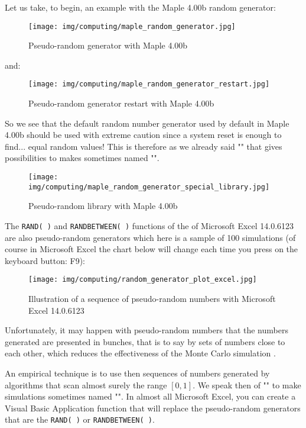 	Let us take, to begin, an example with the Maple 4.00b random generator:
	\begin{figure}[H]
		\centering
		\texttt{[image: img/computing/maple\_random\_generator.jpg]}
		\caption{Pseudo-random generator with Maple 4.00b}
	\end{figure}
	and:
	\begin{figure}[H]
		\centering
		\texttt{[image: img/computing/maple\_random\_generator\_restart.jpg]}
		\caption[]{Pseudo-random generator restart with Maple 4.00b}
	\end{figure}
	So we see that the default random number generator used by default in Maple 4.00b should be used with extreme caution since a system reset is enough to find... equal random values! This is therefore as we already said "" that gives possibilities to makes  sometimes named "".
	\begin{figure}[H]
		\centering
		\texttt{[image: img/computing/maple\_random\_generator\_special\_library.jpg]}
		\caption[]{Pseudo-random library with Maple 4.00b}
	\end{figure}
	The \texttt{RAND( )} and \texttt{RANDBETWEEN( )} functions of the of Microsoft Excel 14.0.6123 are also pseudo-random generators which here is a sample of 100 simulations (of course in Microsoft Excel the chart below will change each time you press on the keyboard button: F9):
	\begin{figure}[H]
		\centering
		\texttt{[image: img/computing/random\_generator\_plot\_excel.jpg]}
		\caption[]{Illustration of a sequence of pseudo-random numbers with Microsoft Excel 14.0.6123}
	\end{figure}
	Unfortunately, it may happen with pseudo-random numbers that the numbers generated are presented in bunches, that is to say by sets of numbers close to each other, which reduces the effectiveness of the Monte Carlo simulation .

	An empirical technique is to use then sequences of numbers generated by algorithms that scan almost surely the range $[0,1]$. We speak then of "" to make simulations sometimes named "". In almost all Microsoft Excel, you can create a Visual Basic Application function that will replace the pseudo-random generators that are the \texttt{RAND( )} or \texttt{RANDBETWEEN( )}.

